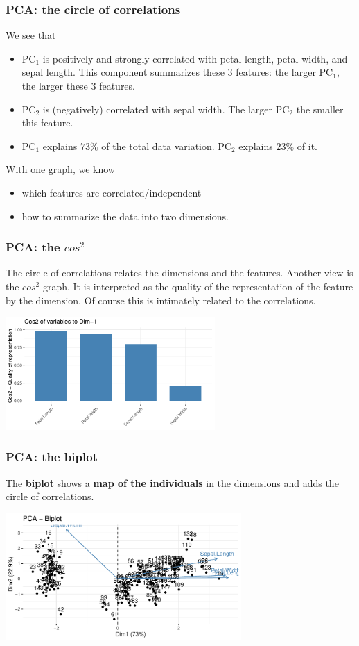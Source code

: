 \begin{frame}
\frametitle{PCA: the circle of correlations}
We see that
\begin{itemize}
\item PC$_1$ is positively and strongly correlated with petal length, petal width, and sepal length. This component summarizes these 3 features: the larger PC$_1$, the larger these 3 features.
\item PC$_2$ is (negatively) correlated with sepal width. The larger PC$_2$ the smaller this feature.
\item PC$_1$ explains $73\%$ of the total data variation. PC$_2$ explains $23\%$ of it.
\end{itemize}
With one graph, we know 
\begin{itemize}
\item which features are correlated/independent
\item how to summarize the data into two dimensions. 
\end{itemize}
\end{frame}
\begin{frame}
\frametitle{PCA: the $cos^2$}
The circle of correlations relates the dimensions and the features. Another view is the {\bf $cos^2$} graph. It is interpreted as the quality of the representation of the feature by the dimension. Of course this is intimately related to the correlations.
\begin{center}
\includegraphics[width=8cm]{../../Graphs/Iris_cos2.pdf}
\end{center}
\end{frame}
\begin{frame}
\frametitle{PCA: the biplot}
The {\bf biplot} shows a {\bf map of the individuals} in the dimensions and adds the circle of correlations. 
\begin{center}
\includegraphics[width=9cm]{../../Graphs/Iris_biplot.pdf}
\end{center}
\end{frame}
